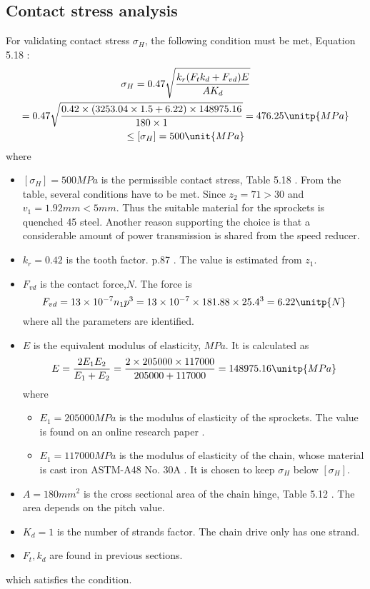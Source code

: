 \subsection{Contact stress analysis}
For validating contact stress $ \sigma_H $, the following condition must be met, Equation 5.18 \cite{tk1}:
\begin{multline*}
\sigma_H = 0.47\sqrt{\dfrac{k_r(F_t k_d+F_{vd})E}{A K_d}} \\
=0.47\sqrt{\dfrac{0.42\times(3253.04\times 1.5+ 6.22)\times 148975.16}{180\times 1}} = 476.25 \unitp{MPa}\\
\leq [\sigma_H] = 500\unit{MPa}
\end{multline*}
where
\begin{itemize}
	\item $ [\sigma_H] =500\unit{MPa} $ is the permissible contact stress, Table 5.18 \cite{tk1}. From the table, several conditions have to be met. Since $ z_2=71>30 $ and $ v_1=1.92\unit{mm}<5 \unit{mm} $. Thus the suitable material for the sprockets is quenched 45 steel. Another reason supporting the choice  is that a considerable amount of power transmission is shared from the speed reducer.
	\item $ k_r=0.42 $ is the tooth factor. p.87 \cite{tk1}. The value is estimated from $ z_1 $.
	\item $ F_{vd} $ is the contact force,$ \unit{N} $. The force is
	\[ F_{vd} = 13\times10^{-7}n_1 p^3 = 13\times10^{-7} \times  181.88 \times 25.4^3 = 6.22 \unitp{N} \]
	where all the parameters are identified.
	\item $ E $ is the equivalent modulus of elasticity, $ \unit{MPa} $. It is calculated as
	\[E = \dfrac{2E_1E_2}{E_1+E_2} = \dfrac{2\times 205000\times 117000}{205000 + 117000}= 148975.16 \unitp{MPa}\]
	where
	\begin{itemize}
		\item $ E_1 = 205000 \unit{MPa} $ is the modulus of elasticity of the sprockets. The value is found on an online research paper \cite{Mareau2013ExperimentalAN}.
		\item $ E_1 = 117000 \unit{MPa} $ is the modulus of elasticity of the chain, whose material is cast iron ASTM-A48 No. 30A \cite{mott_vavrek_wang_2018}. It is chosen to keep $ \sigma_H $ below $ [\sigma_H] $.
	\end{itemize}
	\item $ A = 180 \unit{mm^2} $ is the cross sectional area of the chain hinge, Table 5.12 \cite{tk1}. The area depends on the pitch value.
	\item $ K_d =1 $ is the number of strands factor. The chain drive only has one strand.
	\item $ F_t, k_d $ are found in previous sections.
\end{itemize}
which satisfies the condition.

